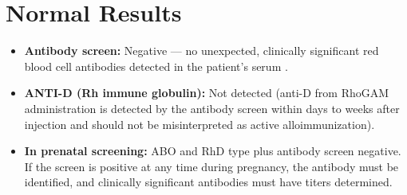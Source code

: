 \section*{Normal Results}
\begin{itemize}
  \item \textbf{Antibody screen:} Negative --- no unexpected, clinically significant red blood cell antibodies detected in the patient's serum \cite{fischbach2023manual}.
  \item \textbf{ANTI-D (Rh immune globulin):} Not detected (anti-D from RhoGAM administration is detected by the antibody screen within days to weeks after injection and should not be misinterpreted as active alloimmunization).
  \item \textbf{In prenatal screening:} ABO and RhD type plus antibody screen negative. If the screen is positive at any time during pregnancy, the antibody must be identified, and clinically significant antibodies must have titers determined.
\end{itemize}

